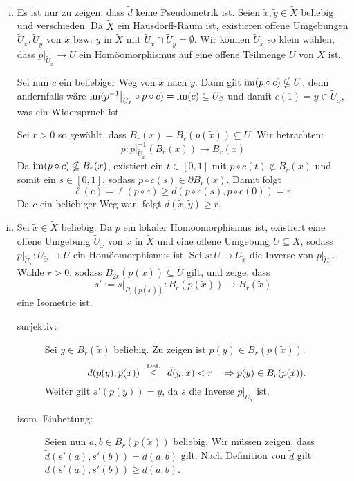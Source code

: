 \begin{beweis}
	\mbox{} \\[-.9cm]
	\begin{enumerate}[(i)]
		\item Es ist nur zu zeigen, dass $\tilde{d}$ keine Pseudometrik ist. 
		Seien $\tilde{x},\tilde{y} \in \tilde{X}$ beliebig und verschieden.
		Da $\tilde{X}$ ein Hausdorff-Raum ist, existieren offene Umgebungen $\tilde{U}_{\tilde{x}}, \tilde{U}_{\tilde{y}}$ von $\tilde{x}$ bzw. $\tilde{y}$ in $\tilde{X}$ mit $\tilde{U}_{\tilde{x}} \cap \tilde{U}_{\tilde{y}} = \emptyset$.
		Wir können $\tilde{U}_{\tilde{x}}$ so klein wählen, dass $p \big|_{\tilde{U}_{\tilde{x}}} \rightarrow U$ ein Homöomorphismus auf eine offene Teilmenge $U$ von $X$ ist.
		
		Sei nun $c$ ein beliebiger Weg von $\tilde{x}$ nach $\tilde{y}$.
		Dann gilt $\operatorname{im}(p \circ c) \nsubseteq U$, denn andernfalls wäre $\operatorname{im}(p^{-1} \big|_{\tilde{U}_{\tilde{x}}} \circ p \circ c) = \operatorname{im}(c) \subseteq \tilde{U}_{\tilde{x}}$ und damit $c(1) = \tilde{y} \in \tilde{U}_{\tilde{x}}$, was ein Widerspruch ist.
		
		Sei $r > 0$ so gewählt, dass $B_r(x) = B_r(p(\tilde{x})) \subseteq U$.
		Wir betrachten:
		\[
			p\colon p \big|_{\tilde{U}_{\tilde{x}}}^{-1} (B_r(x)) \rightarrow B_r(x)
		\]
		Da $\operatorname{im}(p \circ c) \nsubseteq B_r(x)$, existiert ein $t \in [0,1]$ mit $p \circ c(t) \notin B_r(x)$ und somit ein $s \in [0,1]$, sodass $p \circ c(s) \in \partial B_r(x)$.
		Damit folgt
		\[
			\ell(c) = \ell(p \circ c) \geq d(p \circ c (s), p \circ c(0)) = r.
		\]
		Da $c$ ein beliebiger Weg war, folgt $\tilde{d}(\tilde{x},\tilde{y}) \geq r$.
		\item Sei $\tilde{x} \in \tilde{X}$ beliebig.
		Da $p$ ein lokaler Homöomorphismus ist, existiert eine offene Umgebung $\tilde{U}_{\tilde{x}}$ von $\tilde{x}$ in $\tilde{X}$ und eine offene Umgebung $U \subseteq X$, sodass $p \big|_{\tilde{U}_{\tilde{x}}} \colon \tilde{U}_{\tilde{x}} \rightarrow U$ ein Homöomorphismus ist.
		Sei $s \colon U \rightarrow \tilde{U}_{\tilde{x}}$ die Inverse von $p \big|_{\tilde{U}_{\tilde{x}}}$.
		Wähle $r > 0$, sodass $B_{2r}(p(\tilde{x})) \subseteq U$ gilt, und zeige, dass
		\[
			s' := s \big|_{B_r(p(\tilde{x}))} \colon B_r(p(\tilde{x})) \rightarrow B_r(\tilde{x})
		\]
		eine Isometrie ist.
		\begin{description}
			\item[surjektiv:] Sei $y \in B_r(\tilde{x})$ beliebig.
			Zu zeigen ist $p(y) \in B_r(p(\tilde{x}))$.
			\[
				d(p(y),p(\tilde{x})) \stack{\text{Def.}}{\leq} \tilde{d}(y,\tilde{x}) < r \quad \Rightarrow p(y) \in B_r(p(\tilde{x})).
			\] 
			Weiter gilt $s'(p(y)) = y$, da $s$ die Inverse $p\big|_{\tilde{U}_{\tilde{x}}}$ ist.
			\item[isom. Einbettung:] Seien nun $a,b \in B_r(p(\tilde{x}))$ beliebig.
			Wir müssen zeigen, dass $\tilde{d}(s'(a),s'(b)) = d(a,b)$ gilt.
			Nach Definition von $\tilde{d}$ gilt $\tilde{d}(s'(a),s'(b)) \geq d(a,b)$.
			

\end{description}
\end{enumerate}
\end{beweis}
